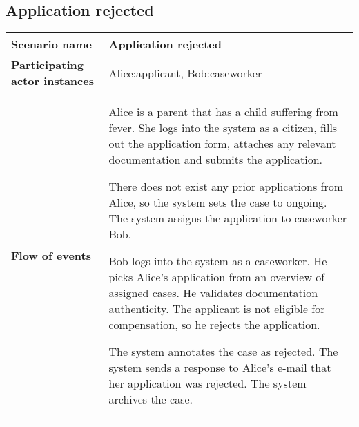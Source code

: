 \subsection*{Application rejected}
\begin{table}[htb!]
\begin{tabularx}{\textwidth}{l|X}
	\textbf{Scenario name} & Application rejected \\
	\hline
	\textbf{Participating actor instances} & Alice:applicant, Bob:caseworker\\
	\hline
	\textbf{Flow of events} &
	\begin{compactenum}
	       \item Alice is a parent that has a child suffering from fever. She logs into the system as a citizen, fills out the application form, attaches any relevant documentation and submits the application.
	       \item There does not exist any prior applications from Alice, so the system sets the case to ongoing. The system assigns the application to caseworker Bob.
	       \item Bob logs into the system as a caseworker. He picks Alice's application from an overview of assigned cases. He validates documentation authenticity. The applicant is not eligible for compensation, so he rejects the application.
	        \item The system annotates the case as rejected. The system sends a response to Alice's e-mail that her application was rejected. The system archives the case.
	\end{compactenum}\\
	\hline
\end{tabularx}
\end{table}

